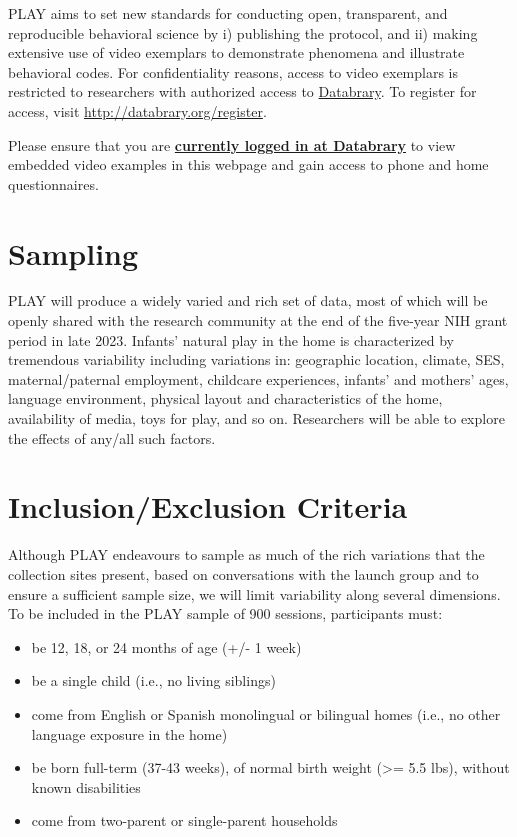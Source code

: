 \documentclass[
]{book}
\providecommand{\tightlist}{%
  \setlength{\itemsep}{0pt}\setlength{\parskip}{0pt}}
\begin{document}
PLAY aims to set new standards for conducting open, transparent, and reproducible behavioral science by i) publishing the protocol, and ii) making extensive use of video exemplars to demonstrate phenomena and illustrate behavioral codes. For confidentiality reasons, access to video exemplars is restricted to researchers with authorized access to \href{http://databrary.org}{Databrary}. To register for access, visit \url{http://databrary.org/register}.

Please ensure that you are \href{https://nyu.databrary.org/user/login}{\textbf{currently logged in at Databrary}} to view embedded video examples in this webpage and gain access to phone and home questionnaires.

\hypertarget{sampling}{%
\section{Sampling}\label{sampling}}

PLAY will produce a widely varied and rich set of data, most of which will be openly shared with the research community at the end of the five-year NIH grant period in late 2023. Infants' natural play in the home is characterized by tremendous variability including variations in: geographic location, climate, SES, maternal/paternal employment, childcare experiences, infants' and mothers' ages, language environment, physical layout and characteristics of the home, availability of media, toys for play, and so on. Researchers will be able to explore the effects of any/all such factors.

\hypertarget{inclusionexclusion-criteria}{%
\section{Inclusion/Exclusion Criteria}\label{inclusionexclusion-criteria}}

Although PLAY endeavours to sample as much of the rich variations that the collection sites present, based on conversations with the launch group and to ensure a sufficient sample size, we will limit variability along several dimensions. To be included in the PLAY sample of 900 sessions, participants must:

\begin{itemize}
\tightlist
\item
  be 12, 18, or 24 months of age (+/- 1 week)
\item
  be a single child (i.e., no living siblings)
\item
  come from English or Spanish monolingual or bilingual homes (i.e., no other language exposure in the home)
\item
  be born full-term (37-43 weeks), of normal birth weight (\textgreater= 5.5 lbs), without known disabilities
\item
  come from two-parent or single-parent households
\end{itemize}
\end{document}

